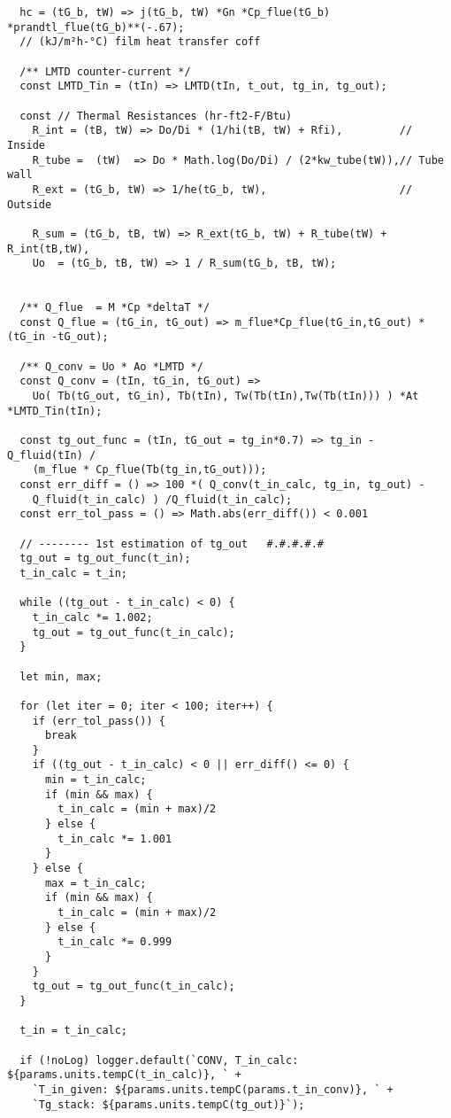 \begin{verbatim}
  hc = (tG_b, tW) => j(tG_b, tW) *Gn *Cp_flue(tG_b) *prandtl_flue(tG_b)**(-.67); 
  // (kJ/m²h-°C) film heat transfer coff

  /** LMTD counter-current */
  const LMTD_Tin = (tIn) => LMTD(tIn, t_out, tg_in, tg_out);

  const // Thermal Resistances (hr-ft2-F/Btu)
    R_int = (tB, tW) => Do/Di * (1/hi(tB, tW) + Rfi),         // Inside
    R_tube =  (tW)  => Do * Math.log(Do/Di) / (2*kw_tube(tW)),// Tube wall
    R_ext = (tG_b, tW) => 1/he(tG_b, tW),                     // Outside

    R_sum = (tG_b, tB, tW) => R_ext(tG_b, tW) + R_tube(tW) + R_int(tB,tW),
    Uo  = (tG_b, tB, tW) => 1 / R_sum(tG_b, tB, tW);


  /** Q_flue  = M *Cp *deltaT */
  const Q_flue = (tG_in, tG_out) => m_flue*Cp_flue(tG_in,tG_out) *(tG_in -tG_out);

  /** Q_conv = Uo * Ao *LMTD */
  const Q_conv = (tIn, tG_in, tG_out) =>
    Uo( Tb(tG_out, tG_in), Tb(tIn), Tw(Tb(tIn),Tw(Tb(tIn))) ) *At *LMTD_Tin(tIn);

  const tg_out_func = (tIn, tG_out = tg_in*0.7) => tg_in - Q_fluid(tIn) /
    (m_flue * Cp_flue(Tb(tg_in,tG_out)));
  const err_diff = () => 100 *( Q_conv(t_in_calc, tg_in, tg_out) -
    Q_fluid(t_in_calc) ) /Q_fluid(t_in_calc);
  const err_tol_pass = () => Math.abs(err_diff()) < 0.001
  
  // -------- 1st estimation of tg_out   #.#.#.#.#
  tg_out = tg_out_func(t_in);
  t_in_calc = t_in;

  while ((tg_out - t_in_calc) < 0) {
    t_in_calc *= 1.002;
    tg_out = tg_out_func(t_in_calc);
  }

  let min, max;

  for (let iter = 0; iter < 100; iter++) {
    if (err_tol_pass()) {
      break
    }
    if ((tg_out - t_in_calc) < 0 || err_diff() <= 0) {
      min = t_in_calc;
      if (min && max) {
        t_in_calc = (min + max)/2
      } else {
        t_in_calc *= 1.001
      }
    } else {
      max = t_in_calc;
      if (min && max) {
        t_in_calc = (min + max)/2
      } else {
        t_in_calc *= 0.999
      }
    }
    tg_out = tg_out_func(t_in_calc);
  }
  
  t_in = t_in_calc;

  if (!noLog) logger.default(`CONV, T_in_calc: ${params.units.tempC(t_in_calc)}, ` +
    `T_in_given: ${params.units.tempC(params.t_in_conv)}, ` +
    `Tg_stack: ${params.units.tempC(tg_out)}`);


\end{verbatim}
